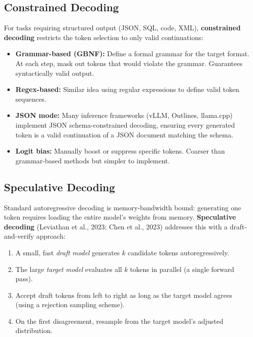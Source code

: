 \subsection{Constrained Decoding}

For tasks requiring structured output (JSON, SQL, code, XML), \textbf{constrained
decoding} restricts the token selection to only valid continuations:

\begin{itemize}
    \item \textbf{Grammar-based (GBNF):} Define a formal grammar for the target
          format.  At each step, mask out tokens that would violate the grammar.
          Guarantees syntactically valid output.
    \item \textbf{Regex-based:} Similar idea using regular expressions to define
          valid token sequences.
    \item \textbf{JSON mode:} Many inference frameworks (vLLM, Outlines, llama.cpp)
          implement JSON schema-constrained decoding, ensuring every generated
          token is a valid continuation of a JSON document matching the schema.
    \item \textbf{Logit bias:} Manually boost or suppress specific tokens.
          Coarser than grammar-based methods but simpler to implement.
\end{itemize}

\subsection{Speculative Decoding}
\label{sec:speculative}

Standard autoregressive decoding is memory-bandwidth bound: generating one token
requires loading the entire model's weights from memory.
\textbf{Speculative decoding} (Leviathan et al., 2023; Chen et al., 2023)
addresses this with a draft-and-verify approach:

\begin{enumerate}
    \item A small, fast \emph{draft model} generates $k$ candidate tokens
          autoregressively.
    \item The large \emph{target model} evaluates all $k$ tokens in parallel
          (a single forward pass).
    \item Accept draft tokens from left to right as long as the target model
          agrees (using a rejection sampling scheme).
    \item On the first disagreement, resample from the target model's adjusted
          distribution.
\end{enumerate}

